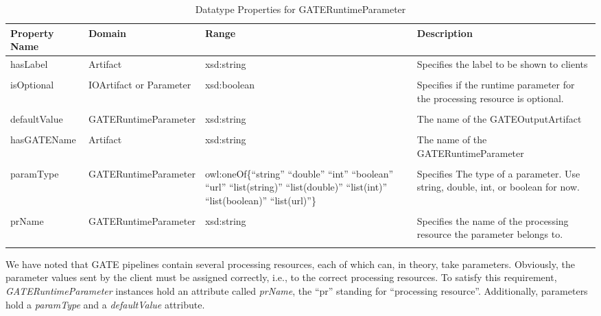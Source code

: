 \begin{table}[tb]
\centering\small\sffamily
\begin{tabular}{p{}@{\hspace*{4mm}}p{}@{\hspace*{2mm}}p{}@{\hspace*{2mm}}p{}}
  \toprule 
  \textbf{Property Name}&\textbf{Domain} &\textbf{Range} &\textbf{Description} \\
  \midrule
 
  hasLabel & Artifact & xsd:string & Specifies the label to be shown to clients
  \\

   & & \\


  isOptional & IOArtifact or Parameter & xsd:boolean & Specifies if the runtime parameter for the processing resource is optional.
  \\

   & & \\ 
  
  defaultValue & GATERuntimeParameter & xsd:string & The name of the GATEOutputArtifact
  \\

   & & \\  

  hasGATEName & Artifact & xsd:string & The name of the GATERuntimeParameter
  \\

   & & \\ 

  paramType & GATERuntimeParameter & owl:oneOf\{``string'' ``double'' ``int'' ``boolean'' ``url'' ``list(string)'' ``list(double)'' ``list(int)'' ``list(boolean)'' ``list(url)''\} & Specifies The type of a parameter. Use string, double, int, or boolean for now.
  \\

   & & \\ 

  prName & GATERuntimeParameter & xsd:string & Specifies the name of the processing resource the parameter belongs to.
  \\

   & & \\ 
  \bottomrule
\end{tabular}
\caption{Datatype Properties for GATERuntimeParameter}
\label{tab:newconcepts}
\end{table}


We have noted that GATE pipelines contain several processing
resources, each of which can, in theory, take parameters. Obviously,
the parameter values sent by the client must be assigned correctly,
i.e., to the correct processing resources. To satisfy this
requirement, \emph{GATERuntimeParameter} instances hold an attribute
called \emph{prName}, the ``pr'' standing for ``processing
resource''. Additionally, parameters hold a \emph{paramType} and a
\emph{defaultValue} attribute.



